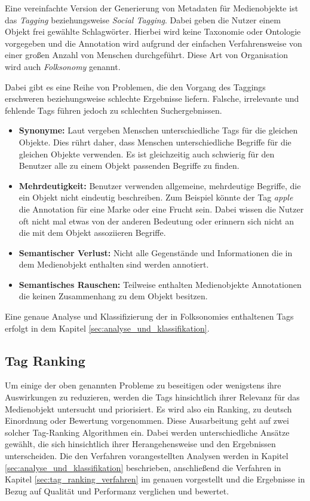Eine vereinfachte Version der Generierung von Metadaten für Medienobjekte ist das \emph{Tagging} beziehungsweise \emph{Social Tagging}. Dabei geben die Nutzer einem Objekt frei gewählte Schlagwörter. Hierbei wird keine Taxonomie oder Ontologie vorgegeben und die Annotation wird aufgrund der einfachen Verfahrensweise von einer großen Anzahl von Menschen durchgeführt. Diese Art von Organisation wird auch \emph{Folksonomy} genannt.

Dabei gibt es eine Reihe von Problemen, die den Vorgang des Taggings erschweren beziehungsweise schlechte Ergebnisse liefern. Falsche, irrelevante und fehlende Tags führen jedoch zu schlechten Suchergebnissen.

\begin{itemize}
  \item \textbf{Synonyme:} Laut \cite{learningToTag} vergeben Menschen unterschiedliche Tags für die gleichen Objekte. Dies rührt daher, dass Menschen unterschiedliche Begriffe für die gleichen Objekte verwenden. Es ist gleichzeitig auch schwierig für den Benutzer alle zu einem Objekt passenden Begriffe zu finden.
  \item \textbf{Mehrdeutigkeit:} Benutzer verwenden allgemeine, mehrdeutige Begriffe, die ein Objekt nicht eindeutig beschreiben. Zum Beispiel könnte der Tag \emph{apple} die Annotation für eine Marke oder eine Frucht sein. Dabei wissen die Nutzer oft nicht mal etwas von der anderen Bedeutung oder erinnern sich nicht an die mit dem Objekt assoziieren Begriffe.
  \item \textbf{Semantischer Verlust:} Nicht alle Gegenstände und Informationen die in dem Medienobjekt enthalten sind werden annotiert.
  \item \textbf{Semantisches Rauschen:} Teilweise enthalten Medienobjekte Annotationen die keinen Zusammenhang zu dem Objekt besitzen.
\end{itemize}


Eine genaue Analyse und Klassifizierung der in Folksonomies enthaltenen Tags erfolgt in dem Kapitel \ref{sec:analyse_und_klassifikation}.

\subsection{Tag Ranking} %
\label{sub:tag_ranking}

Um einige der oben genannten Probleme zu beseitigen oder wenigstens ihre Auswirkungen zu reduzieren, werden die Tags hinsichtlich ihrer Relevanz für das Medienobjekt untersucht und priorisiert. Es wird also ein Ranking, zu deutsch Einordnung oder Bewertung vorgenommen. Diese Ausarbeitung geht auf zwei solcher Tag-Ranking Algorithmen ein. Dabei werden unterschiedliche Ansätze gewählt, die sich hinsichtlich ihrer Herangehensweise und den Ergebnissen unterscheiden. Die den Verfahren vorangestellten Analysen werden in Kapitel \ref{sec:analyse_und_klassifikation} beschrieben, anschließend die Verfahren in Kapitel \ref{sec:tag_ranking_verfahren} im genauen vorgestellt und die Ergebnisse in Bezug auf Qualität und Performanz verglichen und bewertet.

